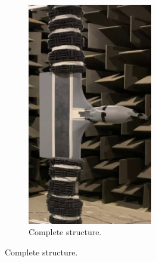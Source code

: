\documentclass[10pt,fleqn,a4paper,twoside]{article}
\begin{document}
\begin{figure}[H]
    \centering
    \begin{subfigure}{0.4\textwidth}
        \includegraphics[width=0.6\textwidth]{Figures/complete_struc.jpg}
        \caption{Complete structure.}
        \label{fig:first}
    \end{subfigure}
    

\end{figure}
\end{document}
